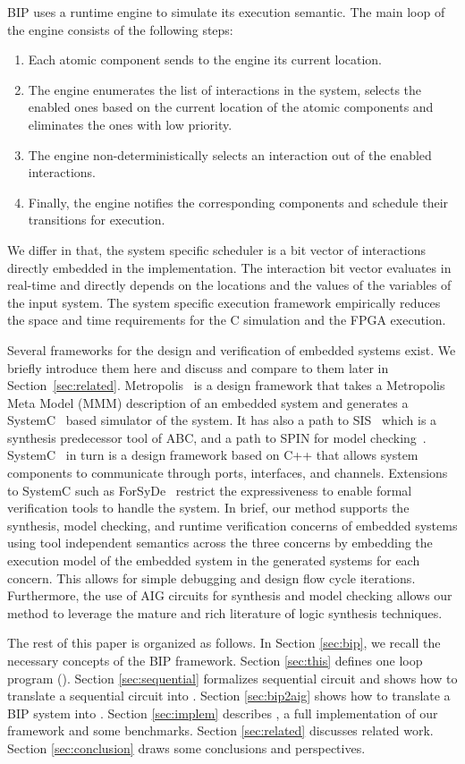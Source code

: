 BIP uses a runtime engine to simulate its execution semantic. 
The main loop of the engine consists of the following steps:
\begin{enumerate}
\item Each atomic component sends to the engine its current location.
\item The engine enumerates the list of interactions in the system, 
  selects the enabled ones based on the current location of the atomic 
  components and eliminates the ones with low priority.
\item The engine non-deterministically selects an interaction out of the enabled interactions.
\item Finally, the engine notifies the corresponding components and schedule their transitions for execution. 
\end{enumerate}
We differ in that, the system specific scheduler is a bit vector of interactions directly embedded in the implementation. 
The interaction bit vector evaluates in real-time and directly depends on the locations and the values of the variables of the input system. 
The system specific execution framework empirically reduces the space and time requirements for the C simulation and the FPGA execution. 

Several frameworks for the design and verification of embedded systems exist. 
We briefly introduce them here and discuss and compare to them later in 
Section~\ref{sec:related}.
Metropolis~\cite{metropolis1,metropolis2} is a design framework that
takes a Metropolis Meta Model (MMM) description of an embedded system 
and generates a SystemC~\cite{systemc} based simulator of the system.
It has also a path to SIS~\cite{brayton92sis} which is a synthesis predecessor tool 
of ABC, and a path to SPIN for model checking~\cite{HolzSpin97}. 
SystemC~\cite{systemc} in turn is a design framework based on C++ that allows
system components to communicate through ports, interfaces, and channels.
Extensions to SystemC such as ForSyDe~\cite{SanderJ04} restrict the 
expressiveness to enable formal verification tools to handle the system. 
In brief, our method supports the synthesis, model checking, and runtime verification 
concerns of embedded systems using tool independent semantics across the three concerns
by embedding the execution model of the embedded system in the generated systems 
for each concern. 
This allows for simple debugging and design flow cycle iterations. Furthermore, 
the use of AIG circuits for synthesis and model checking allows our method to leverage
the mature and rich literature of logic synthesis techniques. 

The rest of this paper is organized as follows. In Section \ref{sec:bip}, we recall the necessary concepts of the BIP framework. Section \ref{sec:this} defines one loop program (\caig). Section \ref{sec:sequential} formalizes sequential circuit and shows how to translate a sequential circuit into \caig. Section \ref{sec:bip2aig} shows how to translate a BIP system into \caig. Section \ref{sec:implem}
describes \biptool{}, a full implementation of our framework and some benchmarks. Section \ref{sec:related} discusses related work. Section \ref{sec:conclusion} draws some conclusions and perspectives.
